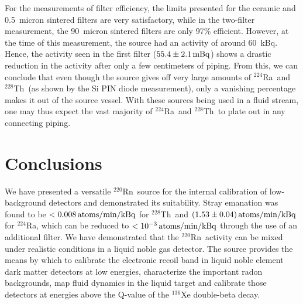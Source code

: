 For the measurements of filter efficiency, the limits presented for the ceramic and 0.5~micron sintered filters are very satisfactory, while in the two-filter measurement, the 90~micron sintered filters are only 97\% efficient. However, at the time of this measurement, the source had an activity of around 60~kBq. Hence, the activity seen in the first filter ($55.4\pm2.1\,\mathrm{mBq}$) shows a drastic reduction in the activity after only a few centimeters of piping. From this, we can conclude that even though the source gives off very large amounts of $^{224}$Ra~and $^{228}$Th~(as shown by the Si PIN diode measurement), only a vanishing percentage makes it out of the source vessel. With these sources being used in a fluid stream, one may thus expect the vast majority of $^{224}$Ra~and $^{228}$Th~to plate out in any connecting piping.

\section{Conclusions}

We have presented a versatile $^{220}$Rn~source for the internal calibration of low-background detectors and demonstrated its suitability. Stray emanation was found to be $<0.008\,\mathrm{atoms/min/kBq}$ for $^{228}$Th~and $(1.53\pm0.04)\,\mathrm{atoms/min/kBq}$ for $^{224}$Ra, which can be reduced to $<10^{-3}\,\mathrm{atoms/min/kBq}$ through the use of an additional filter. We have demonstrated that the $^{220}$Rn~activity can be mixed under realistic conditions in a liquid noble gas detector. The source provides the means by which to calibrate the electronic recoil band in liquid noble element dark matter detectors at low energies, characterize the important radon backgrounds, map fluid dynamics in the liquid target and calibrate those detectors at energies above the Q-value of the $^{136}$Xe double-beta decay.